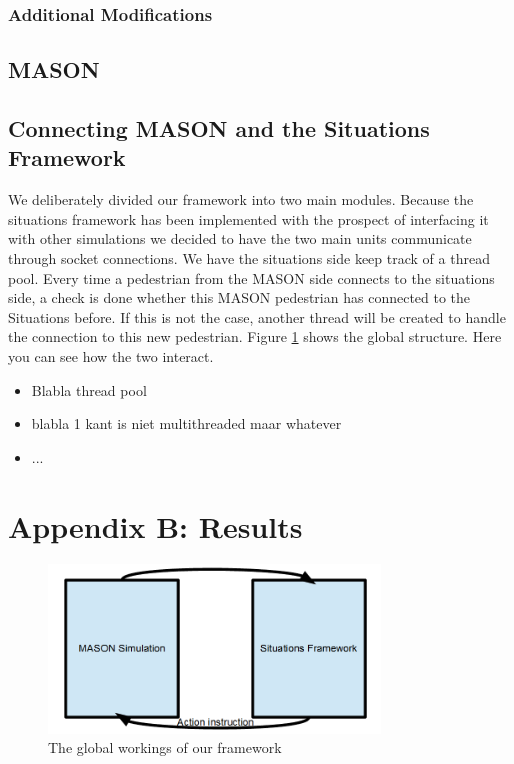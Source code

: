 \documentclass[11pt]{book}
\begin{document}
\subsubsection{Additional Modifications}


\subsection{MASON}

\subsection{Connecting MASON and the Situations Framework}
We deliberately divided our framework into two main modules. Because the situations framework has been implemented with the prospect of interfacing it with other simulations we decided to have the two main units communicate through socket connections. We have the situations side keep track of a thread pool. Every time a pedestrian from the MASON side connects to the situations side, a check is done whether this MASON pedestrian has connected to the Situations before. If this is not the case, another thread will be created to handle the connection to this new pedestrian.  Figure \ref{framework}  shows the global structure. Here you can see how the two interact.
\begin{itemize}
\item Blabla thread pool
\item blabla 1 kant is niet multithreaded maar whatever
\item ...
\end{itemize}


\section{Appendix B: Results}
\begin{figure}
\centering
\includegraphics[width=250pt]{framework}
\caption{The global workings of our framework}
\label{framework}
\end{figure}






\end{document}
